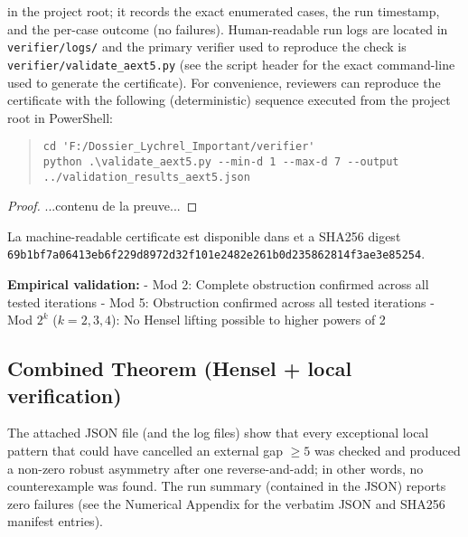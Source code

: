 \documentclass[12pt,a4paper]{article}
\begin{document}
in the project root; it records the exact enumerated cases, the run timestamp,
and the per-case outcome (no failures). Human-readable run logs are located in
\texttt{verifier/logs/} and the primary verifier used to reproduce the check
is \verb|verifier/validate_aext5.py| (see the script header for the exact
command-line used to generate the certificate). For convenience, reviewers can
reproduce the certificate with the following (deterministic) sequence executed
from the project root in PowerShell:
\begin{quote}\small
\verb|cd 'F:/Dossier_Lychrel_Important/verifier'|\\
\verb|python .\validate_aext5.py --min-d 1 --max-d 7 --output ../validation_results_aext5.json|
\end{quote}

\begin{proof}
...contenu de la preuve...
\end{proof}

La machine-readable certificate est disponible dans \texttt{} et a SHA256 digest \texttt{69b1bf7a06413eb6f229d8972d32f101e2482e261b0d235862814f3ae3e85254}.

\textbf{Empirical validation:}
- Mod 2: Complete obstruction confirmed across all tested iterations
- Mod 5: Obstruction confirmed across all tested iterations
- Mod $2^k$ ($k=2,3,4$): No Hensel lifting possible to higher powers of 2


\subsection{Combined Theorem (Hensel + local verification)}%

The attached JSON file (and the log files) show that every exceptional local
pattern that could have cancelled an external gap $\ge 5$ was checked and
produced a non-zero robust asymmetry after one reverse-and-add; in other
words, no counterexample was found. The run summary (contained in the JSON)
reports zero failures (see the Numerical Appendix for the verbatim JSON and
SHA256 manifest entries).
\end{document}
